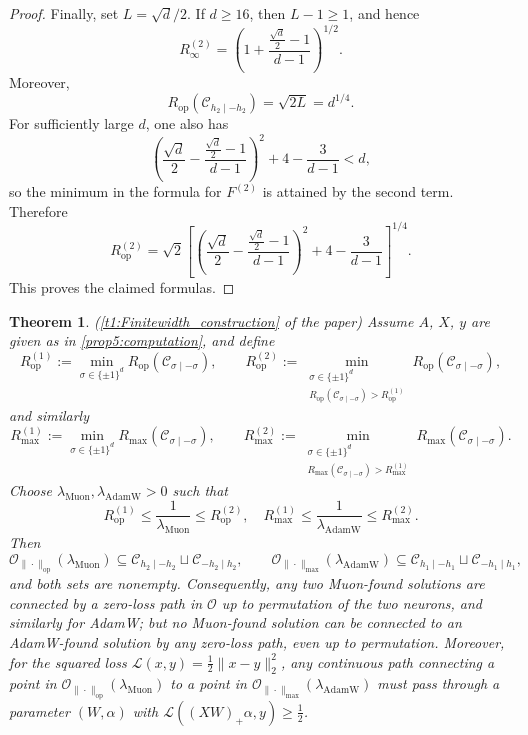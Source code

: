 \documentclass{article}
\newtheorem{theorem}{Theorem}[section]
\newcommand{\op}{\mathrm{op}}
\begin{document}
\begin{proof}
Finally, set $L=\sqrt d/2$. If $d\ge16$, then $L-1\ge1$, and hence
\[
R_\infty^{(2)}
=
\left(
1+\frac{\frac{\sqrt d}{2}-1}{d-1}
\right)^{1/2}.
\]
Moreover,
\[
R_{\mathrm{op}}(\mathcal C_{h_2\mid-h_2})
=
\sqrt{2L}
=
d^{1/4}.
\]
For sufficiently large $d$, one also has
\[
\left(
\frac{\sqrt d}{2}
-
\frac{\frac{\sqrt d}{2}-1}{d-1}
\right)^2
+
4-\frac{3}{d-1}
< d,
\]
so the minimum in the formula for $F^{(2)}$ is attained by the second term. Therefore
\[
R_{\mathrm{op}}^{(2)}
=
\sqrt2
\left[
\left(
\frac{\sqrt d}{2}
-
\frac{\frac{\sqrt d}{2}-1}{d-1}
\right)^2
+
4-\frac{3}{d-1}
\right]^{1/4}.
\]
This proves the claimed formulas.
\end{proof}

\begin{theorem}
\label{appxt1:Finitewidth_construction}
(\cref{t1:Finitewidth_construction} of the paper)
Assume $A$, $X$, $y$ are given as in \cref{prop5:computation}, and define
\[
R_{\op}^{(1)}
:=
\min_{\sigma\in\{\pm1\}^d}
R_{\op}(\mathcal C_{\sigma\mid-\sigma}),
\qquad
R_{\op}^{(2)}
:=
\min_{\substack{\sigma\in\{\pm1\}^d\\
R_{\op}(\mathcal C_{\sigma\mid-\sigma})>R_{\op}^{(1)}}}
R_{\op}(\mathcal C_{\sigma\mid-\sigma}),
\]
and similarly
\[
R_{\max}^{(1)}
:=
\min_{\sigma\in\{\pm1\}^d}
R_{\max}(\mathcal C_{\sigma\mid-\sigma}),
\qquad
R_{\max}^{(2)}
:=
\min_{\substack{\sigma\in\{\pm1\}^d\\
R_{\max}(\mathcal C_{\sigma\mid-\sigma})>R_{\max}^{(1)}}}
R_{\max}(\mathcal C_{\sigma\mid-\sigma}).
\]
Choose $\lambda_{\mathrm{Muon}},\lambda_{\mathrm{AdamW}}>0$ such that
\[
R_{\op}^{(1)}
\leq
\frac{1}{\lambda_{\mathrm{Muon}}}
\leq
R_{\op}^{(2)},
\quad
R_{\max}^{(1)}
\leq
\frac{1}{\lambda_{\mathrm{AdamW}}} \leq
R_{\max}^{(2)}.
\]
Then
\[
\mathcal{O}_{\|\cdot\|_{\op}}(\lambda_{\mathrm{Muon}})
\subseteq
\mathcal C_{h_2\mid-h_2}\sqcup \mathcal C_{-h_2\mid h_2},
\qquad
\mathcal{O}_{\|\cdot\|_{\max}}(\lambda_{\mathrm{AdamW}})
\subseteq
\mathcal C_{h_1\mid-h_1}\sqcup \mathcal C_{-h_1\mid h_1},
\]
and both sets are nonempty. Consequently, any two Muon-found solutions are connected by a zero-loss path in $\mathcal{O}$ up to permutation of the two neurons, and similarly for AdamW; but no Muon-found solution can be connected to an AdamW-found solution by any zero-loss path, even up to permutation. Moreover, for the squared loss $\mathcal{L}(x,y) = \tfrac{1}{2}\|x-y\|_2^2$, any continuous path connecting a point in $\mathcal{O}_{\|\cdot\|_{\op}}(\lambda_{\mathrm{Muon}})$ to a point in $\mathcal{O}_{\|\cdot\|_{\max}}(\lambda_{\mathrm{AdamW}})$ must pass through a parameter $(W,\alpha)$ with $\mathcal{L}((XW)_+\alpha, y) \geq \tfrac{1}{2}$.
\end{theorem}
 
\end{document}
